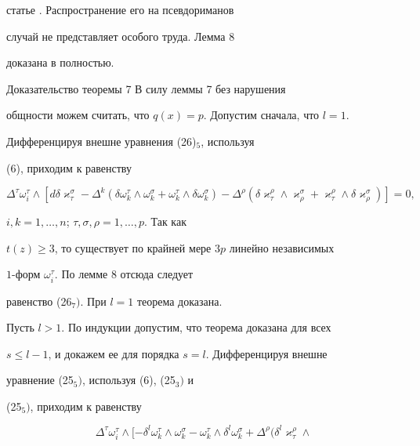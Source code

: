 статье \cite{Che}. Распространение его на псевдориманов


случай не представляет особого труда. Лемма 8


доказана в \cite{Che} полностью.





\begin{pf*}{Доказательство теоремы 7} В силу леммы 7 без нарушения


общности можем считать, что $q(x)=p$. Допустим сначала, что $l=1$.


Дифференцируя внешне уравнения (26)${}_5$, используя


(6), приходим к равенству


$$


\Delta^{\tau}\omega^{\tau}_i\wedge[d\delta\varkappa^{\sigma}_{\tau}-


\Delta^k(\delta\omega^{\tau}_k\wedge\omega^{\sigma}_k+


\omega^{\tau}_k\wedge\delta\omega^{\sigma}_k)-\Delta^{\rho}(


\delta\varkappa^{\rho}_{\tau}\wedge\varkappa^{\sigma}_{\rho}+


\varkappa^{\rho}_{\tau}\wedge\delta\varkappa^{\sigma}_{\rho})]=0,


$$


$i,k=1,\dotsc,n$; $\tau,\sigma,\rho=1,\dotsc,p$. Так как


$t(z)\ge 3$, то существует по крайней мере $3p$ линейно независимых


$1$-форм $\omega^{\tau}_i$. По лемме 8 отсюда следует


равенство (26${}_7)$. При $l=1$ теорема доказана.





Пусть $l>1$. По индукции допустим, что теорема доказана для всех


$s\le l-1$, и докажем ее для порядка $s=l$. Дифференцируя внешне


уравнение (25${}_5)$, используя (6), (25${}_3)$ и


(25${}_5)$, приходим к равенству


\begin{equation}


\Delta^{\tau}\omega^{\tau}_i\wedge[-\delta^l\omega^{\tau}_k\wedge


\omega^{\sigma}_k-\omega^{\tau}_k\wedge\delta^l\omega^{\sigma}_k+


\Delta^{\rho}(\delta^l\varkappa^{\rho}_{\tau}\wedge



\end{equation}
\end{pf*}
